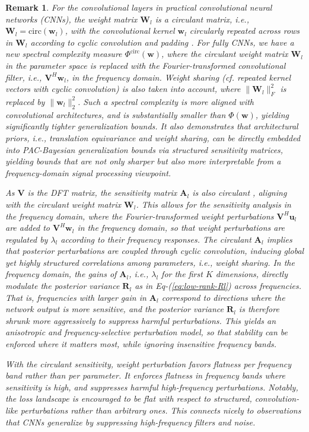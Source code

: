 \documentclass[journal]{IEEEtran} %
\def\eqref#1{Eq-(\ref{#1})}
\newtheorem{remark}{Remark}%
\def\vu{{\bm{u}}}
\def\vw{{\bm{w}}}
\def\mA{{\bm{A}}}
\def\mR{{\bm{R}}}
\def\mV{{\bm{V}}}
\def\mW{{\bm{W}}}
\newcommand{\Norm}[1]{\|#1\|}
\begin{document}
\begin{remark}\upshape
For the convolutional layers in practical convolutional neural networks (CNNs), the weight matrix $\mW_l$ is a circulant matrix, i.e., $\mW_l = \mathrm{circ}(\vw_l)$, with the convolutional kernel $\vw_l$ circularly repeated across rows in $\mW_l$ according to cyclic convolution and padding \cite{sedghi2018the,gray2006toeplitz}. For fully CNNs, we have a new spectral complexity measure ${\Phi}^{\mathrm{circ}}(\vw)$, where the circulant weight matrix $\mW_l$ in the parameter space is replaced with the Fourier-transformed convolutional filter, i.e., $\mV^H \vw_l$, in the frequency domain. Weight sharing (cf. repeated kernel vectors with cyclic convolution) is also taken into account, where $\Norm{\mW_l}_F^2$ is replaced by  $\Norm{\vw_l}_2^2$. Such a spectral complexity is more aligned with convolutional architectures, and is substantially smaller than ${\Phi}(\vw)$, yielding significantly tighter generalization bounds.
It also demonstrates that architectural priors, i.e., translation equivariance and weight sharing, can be directly embedded into PAC-Bayesian generalization bounds via structured sensitivity matrices, yielding bounds that are not only sharper but also more interpretable from a frequency-domain signal processing viewpoint.

As $\mV$ is the DFT matrix, the sensitivity matrix $\mA_l$ is also circulant \cite{gray2006toeplitz}, aligning with the circulant weight matrix $\mW_l$. This allows for the sensitivity analysis in the frequency domain, where the Fourier-transformed weight perturbations $\mV^H \vu_l$ are added to $\mV^H \vw_l$ in the frequency domain, so that weight perturbations are regulated by $\lambda_l$ according to their frequency responses. 
The circulant $\mA_l$ implies that posterior perturbations are coupled through cyclic convolution, inducing global yet highly structured correlations among parameters, i.e., weight sharing. In the frequency domain, the gains of $\mA_l$, i.e., $\lambda_l$ for the first $K$ dimensions, directly modulate the posterior variance $\mR_l$ as in \eqref{eq:low-rank-Rl} across frequencies. That is, frequencies with larger gain in $\mA_l$ correspond to directions where the network output is more sensitive, and the posterior variance $\mR_l$ is therefore shrunk more aggressively to suppress harmful perturbations. This yields an anisotropic and frequency-selective perturbation model, so that stability can be enforced where it matters most, while ignoring insensitive frequency bands. 
    
With the circulant sensitivity, weight perturbation favors flatness per frequency band rather than per parameter.
It enforces flatness in frequency bands where sensitivity is high, and suppresses harmful high-frequency perturbations.
Notably, the loss landscape is encouraged to be flat with respect to structured, convolution-like perturbations rather than arbitrary ones. This connects nicely to observations that CNNs generalize by suppressing high-frequency filters and noise.
\end{remark}
%
\end{document}

